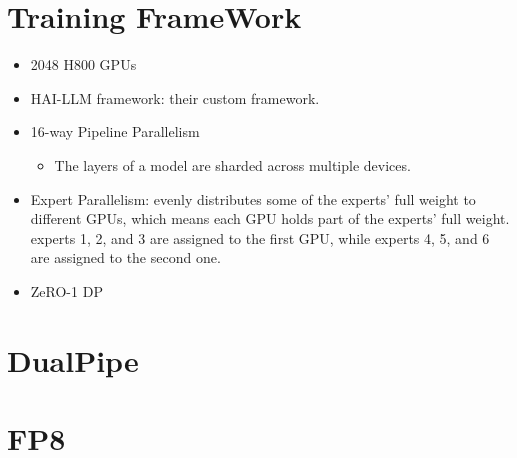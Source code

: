 \section{Training FrameWork}
\begin{itemize}
	\item 2048 H800 GPUs
	\item HAI-LLM framework: their custom framework. 
	\item 16-way Pipeline Parallelism
		\begin{itemize}
			\item The layers of a model are sharded across multiple devices. 
		\end{itemize}
	\item Expert Parallelism: evenly distributes some of the experts' full weight to different GPUs, which means each GPU holds part of the experts' full weight. \eg experts 1, 2, and 3 are assigned to the first GPU, while experts 4, 5, and 6 are assigned to the second one.
	\item ZeRO-1 DP
\end{itemize}
\section{DualPipe}
\section{FP8}


